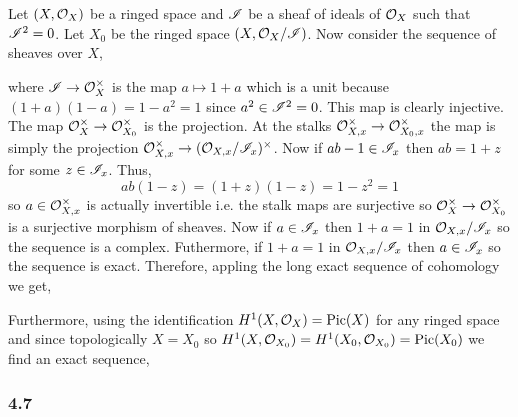 \documentclass[12pt]{article}
\begin{document}
Let $(X, \mathcal{O}_{X})$ be a ringed space and $\mathscr{I}$ be a sheaf of ideals of $\mathcal{O}_{X}$ such that $\mathscr{I}^2 = 0$. Let $X_0$ be the ringed space $(X, \mathcal{O}_{X} / \mathscr{I})$. Now consider the sequence of sheaves over $X$,
\begin{center}
\end{center}
where $\mathscr{I} \to \mathcal{O}_{X}^\times$ is the map $a \mapsto 1 + a$ which is a unit because $(1 + a)(1 - a) = 1 - a^2 = 1$ since $a^2 \in \mathscr{I}^2 = 0$. This map is clearly injective. The map $\mathcal{O}_{X}^\times \to \mathcal{O}_{X_0}^\times$ is the projection. At the stalks $\mathcal{O}_{X, x}^\times \to \mathcal{O}_{X_0, x}^\times$ the map is simply the projection $\mathcal{O}_{X, x}^\times \to (\mathcal{O}_{X, x} / \mathscr{I}_x)^\times$. Now if $ab - 1 \in \mathscr{I}_x$ then $ab = 1 + z$ for some $z \in \mathscr{I}_x$. Thus,
\[ ab(1 - z) = (1 + z)(1 - z) = 1 - z^2 = 1 \]
so $a \in \mathcal{O}_{X, x}^\times$ is actually invertible i.e. the stalk maps are surjective so $\mathcal{O}_{X}^\times \to \mathcal{O}_{X_0}^\times$ is a surjective morphism of sheaves. Now if $a \in \mathscr{I}_x$ then $1 + a = 1$ in $\mathcal{O}_{X, x} / \mathscr{I}_x$ so the sequence is a complex. Futhermore, if $1 + a = 1$ in $\mathcal{O}_{X, x} / \mathscr{I}_x$ then $a \in \mathscr{I}_x$ so the sequence is exact. Therefore, appling the long exact sequence of cohomology we get,
\begin{center}
\end{center}
Furthermore, using the identification $H^1(X, \mathcal{O}_{X}) = \mathrm{Pic}(X)$ for any ringed space and since topologically $X = X_0$ so $H^1(X, \mathcal{O}_{X_0}) = H^1(X_0, \mathcal{O}_{X_0}) = \mathrm{Pic}(X_0)$ we find an exact sequence,
\begin{center}
\end{center}

\subsubsection{4.7}
\end{document}

